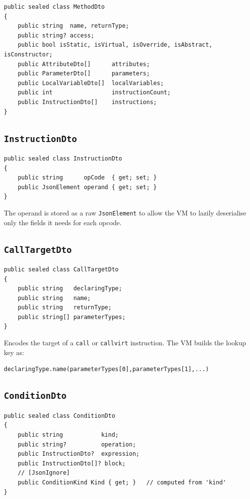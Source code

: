 \documentclass[11pt,a4paper]{article}
\newcommand{\code}[1]{\texttt{\small #1}}
\newcommand{\typename}[1]{\textcolor{typecolor}{\texttt{\small #1}}}
\begin{document}
\begin{lstlisting}[style=cs]
public sealed class MethodDto
{
    public string  name, returnType;
    public string? access;
    public bool isStatic, isVirtual, isOverride, isAbstract, isConstructor;
    public AttributeDto[]      attributes;
    public ParameterDto[]      parameters;
    public LocalVariableDto[]  localVariables;
    public int                 instructionCount;
    public InstructionDto[]    instructions;
}
\end{lstlisting}

\subsection{\texttt{InstructionDto}}

\begin{lstlisting}[style=cs]
public sealed class InstructionDto
{
    public string      opCode  { get; set; }
    public JsonElement operand { get; set; }
}
\end{lstlisting}

The operand is stored as a raw \typename{JsonElement} to allow the VM to lazily
deserialise only the fields it needs for each opcode.

\subsection{\texttt{CallTargetDto}}

\begin{lstlisting}[style=cs]
public sealed class CallTargetDto
{
    public string   declaringType;
    public string   name;
    public string   returnType;
    public string[] parameterTypes;
}
\end{lstlisting}

Encodes the target of a \code{call} or \code{callvirt} instruction. The VM builds
the lookup key as:

\begin{center}
  \code{declaringType.name(parameterTypes[0],parameterTypes[1],...)}
\end{center}

\subsection{\texttt{ConditionDto}}

\begin{lstlisting}[style=cs]
public sealed class ConditionDto
{
    public string           kind;
    public string?          operation;
    public InstructionDto?  expression;
    public InstructionDto[]? block;
    // [JsonIgnore]
    public ConditionKind Kind { get; }   // computed from 'kind'
}
\end{lstlisting}
\end{document}
